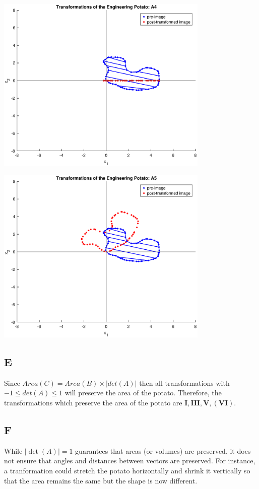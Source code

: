 \documentclass{article}
\begin{document}
\includegraphics [width=4in]{5.eps}

\includegraphics [width=4in]{6.eps}

\subsection*{E}

Since \(Area(C)= Area(B) \times |det(A)|\) then all transformations with \(-1 \leq det(A) \leq 1\) will preserve the area of the potato. Therefore, the transformations which preserve the area of the potato are \(\mathbf{I, III, V, (VI)}\).

\subsection*{F}

While \(|\det(A)| = 1\) guarantees that areas (or volumes) are preserved, it does not ensure that angles and distances between vectors are preserved. For instance, a tranformation could stretch the potato horizontally and shrink it vertically so that the area remains the same but the shape is now different.
\end{document}
